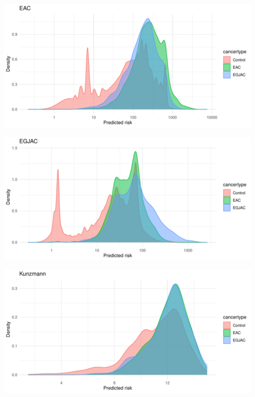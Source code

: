 \documentclass[12pt]{article}
\begin{document}
\begin{center}
\includegraphics[width=1.0\textwidth]{figures/risk_distributions/EAC.pdf}
\end{center}

\begin{center}
\includegraphics[width=1.0\textwidth]{figures/risk_distributions/EGJAC.pdf}
\end{center}

\begin{center}
\includegraphics[width=1.0\textwidth]{figures/risk_distributions/Kunzmann.pdf}
\end{center}
\end{document}
